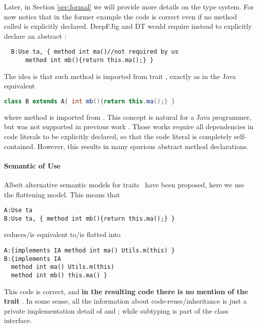Later, in Section \ref{sec:formal} we will provide more details on the type
system. 
For now notice that in the former example the code is correct even if
no method called \Q@ma@ is explicitly declared.
DeepFJig and DT would require instead to explicitly declare an abstract \Q@ma@:
\saveSpace
\begin{lstlisting}
  B:Use ta, { method int ma()//not required by us
      method int mb(){return this.ma();} }
\end{lstlisting}\saveSpace
\noindent
The idea is that such method is imported from trait \Q@ta@, exactly as in the Java equivalent
\saveSpace\begin{lstlisting}[language=Java]
  class B extends A{ int mb(){return this.ma();} }  
\end{lstlisting}
\saveSpace
where method \Q@ma@ is imported from \Q@A@.
This concept is natural for a Java programmer, but was not supported
in previous work \cite{Damiani2014,deep}. Those works require all
dependencies in code literals to be explicitly declared, so that the
code literal is completely self-contained. However, this results in
many spurious abstract method declarations.

\paragraph{Semantic of Use}
Albeit alternative semantic models for traits~\cite{Traits:ECOOP2003} have been proposed,
here we use the flattening model. This means that 
\saveSpace\begin{lstlisting}
A:Use ta
B:Use ta, { method int mb(){return this.ma();} }
\end{lstlisting}\saveSpace
 
\noindent reduces/is equivalent to/is flatted into
  
\saveSpace \begin{lstlisting}
A:{implements IA method int ma() Utils.m(this) }
B:{implements IA
  method int ma() Utils.m(this)
  method int mb() this.ma() } 
 \end{lstlisting}
\saveSpace 
 This code is correct, and {\bf in the resulting code there is no mention of the trait
 \Q@ta@}. In some sense, all the information about code-reuse/inheritance
  is just a private implementation detail of \Q@A@
 and \Q@B@; while subtyping is part of the class interface.






